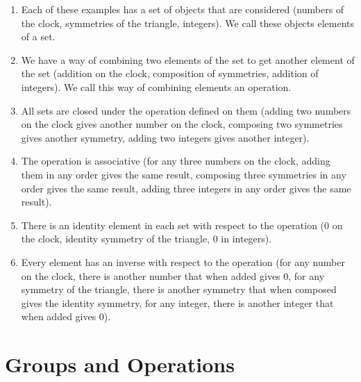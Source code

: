 \documentclass[openany]{book}
\begin{document}
\begin{enumerate}
    \item Each of these examples has a set of objects that are considered (numbers of the clock, symmetries of the triangle, integers). We call these objects elements of a set.
    \item We have a way of combining two elements of the set to get another element of the set (addition on the clock, composition of symmetries, addition of integers). We call this way of combining elements an operation.
    \item All sets are closed under the operation defined on them (adding two numbers on the clock gives another number on the clock, composing two symmetries gives another symmetry, adding two integers gives another integer).
    \item The operation is associative (for any three numbers on the clock, adding them in any order gives the same result, composing three symmetries in any order gives the same result, adding three integers in any order gives the same result).
    \item There is an identity element in each set with respect to the operation (0 on the clock, identity symmetry of the triangle, 0 in integers).
    \item Every element has an inverse with respect to the operation (for any number on the clock, there is another number that when added gives 0, for any symmetry of the triangle, there is another symmetry that when composed gives the identity symmetry, for any integer, there is another integer that when added gives 0).
\end{enumerate}
\section{Groups and Operations}
\end{document}
